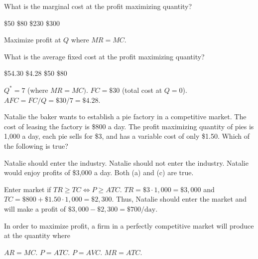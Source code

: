 \documentclass[addpoints,11pt]{exam}
\theoremstyle{definition}
\begin{document}
\begin{questions}
			
			\question \label{blah1} What is the marginal cost at the profit maximizing quantity?
			\begin{choices}
				\choice \$50
				\CorrectChoice \$80
				\choice \$230
				\choice \$300
			\end{choices}
			
			\begin{solution}
				Maximize profit at $Q$ where $MR = MC.$
			\end{solution}
			
			\question \label{blah2} What is the average fixed cost at the profit maximizing quantity?
			
			\begin{choices}
				\choice \$54.30
				\CorrectChoice \$4.28
				\choice \$50
				\choice \$80
			\end{choices}
			
			\begin{solution}
				$Q^* = 7$ (where $MR = MC).$ $FC = \$30$ (total cost at $Q=0$). $AFC = FC/Q = \$30/7 = \$4.28$.
			\end{solution}
			
			
			\question Natalie the baker wants to establish a pie factory in a competitive market. The cost of leasing the factory is \$800 a day. The profit maximizing quantity of pies is 1,000 a day, each pie sells for \$3, and has a variable cost of only \$1.50. Which of the following is true?
			
			\begin{choices}
				\CorrectChoice Natalie should enter the industry.
				\choice Natalie should not enter the industry.
				\choice Natalie would enjoy profits of \$3,000 a day.
				\choice Both (a) and (c) are true.
			\end{choices}
			
			\begin{solution}
				Enter market if $TR \ge TC \iff P \ge ATC$. $TR = \$3\cdot 1,000 = \$3,000$ and $TC = \$800 + \$1.50\cdot 1,000 = \$2,300$. Thus, Natalie should enter the market and will make a profit of $\$3,000 - \$2,300 = \$700/\text{day}.$
			\end{solution}
			
			\question In order to maximize profit, a firm in a perfectly competitive market will produce at the quantity where
			
			\begin{choices}
				\CorrectChoice $AR = MC$.
				\choice $P = ATC$.
				\choice $P = AVC$.
				\choice $MR = ATC$.
			\end{choices}


\end{questions}
\end{document}
